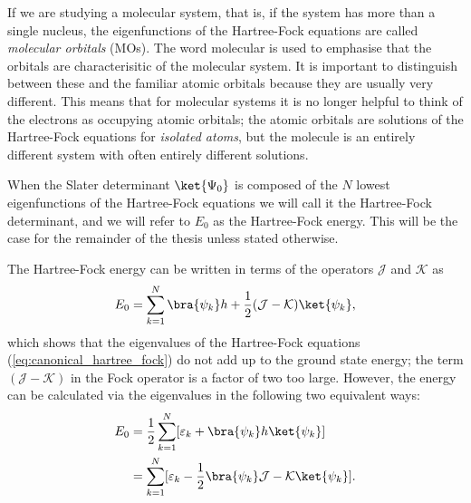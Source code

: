 If we are studying a molecular system, that is, if the system has more than a single nucleus,
the eigenfunctions of the Hartree-Fock equations are called \emph{molecular orbitals} (MOs). The word
molecular is used to emphasise that the orbitals are characterisitic of the molecular system.
It is important to distinguish between these and the familiar atomic orbitals because they are usually
very different. This means that for molecular systems it is no longer helpful to think of the
electrons as occupying atomic orbitals; the atomic orbitals are solutions of the Hartree-Fock equations
for \emph{isolated atoms}, but the molecule is an entirely different system with often entirely 
different solutions.

When the Slater determinant $\ket{\Psi_0}$ is composed of the $N$ lowest
eigenfunctions of the Hartree-Fock equations we will call it the Hartree-Fock determinant,
and we will refer to $E_0$ as the Hartree-Fock energy. This will be the case for the
remainder of the thesis unless stated otherwise.



The Hartree-Fock energy can be written in terms of the operators $\mathcal J$ and $\mathcal K$ as
\begin{equation}
 E_0 = \sum_{k=1}^N\bra{\psi_k}h + \frac{1}{2}(\mathcal J - \mathcal K) \ket{\psi_k},
\end{equation}
which shows that the eigenvalues of the Hartree-Fock equations (\ref{eq:canonical_hartree_fock}) do not add up to the ground state energy; the term $(\mathcal J-\mathcal K)$ in the Fock operator
is a factor of two too large. However, the energy can be calculated via the eigenvalues in the following two equivalent ways:
\begin{equation}
\label{eq:E_ref2}
\begin{split}
 E_0 & = \frac{1}{2}\sum_{k=1}^N[\varepsilon_k + \bra{\psi_k}h\ket{\psi_k}] \\
         & = \sum_{k=1}^N[\varepsilon_k - \frac{1}{2}\bra{\psi_k}\mathcal J - \mathcal K\ket{\psi_k}].
 \end{split}
\end{equation}




